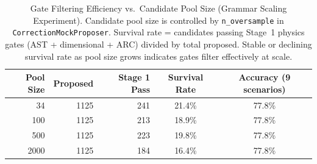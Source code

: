 \begin{table}[H]
\centering\footnotesize
\caption{Gate Filtering Efficiency vs.\ Candidate Pool Size (Grammar Scaling Experiment). Candidate pool size is controlled by \texttt{n\_oversample} in \texttt{CorrectionMockProposer}. Survival rate = candidates passing Stage~1 physics gates (AST + dimensional + ARC) divided by total proposed. Stable or declining survival rate as pool size grows indicates gates filter effectively at scale.}
\label{tab:grammar_scaling}
\begin{tabular}{r r r c c}
\toprule
\textbf{Pool Size} & \textbf{Proposed} & \textbf{Stage 1 Pass} & \textbf{Survival Rate} & \textbf{Accuracy (9 scenarios)} \\
\midrule
34 & 1125 & 241 & 21.4\% & 77.8\% \\
100 & 1125 & 213 & 18.9\% & 77.8\% \\
500 & 1125 & 223 & 19.8\% & 77.8\% \\
2000 & 1125 & 184 & 16.4\% & 77.8\% \\
\bottomrule
\end{tabular}
\end{table}

